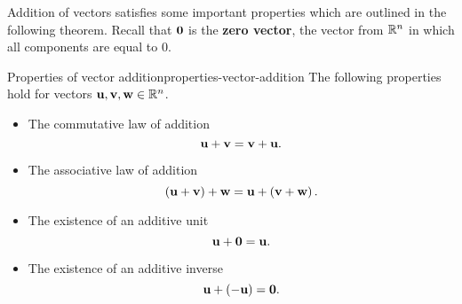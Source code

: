 Addition of vectors satisfies some important properties which are
outlined in the following theorem.  Recall that $\mbox{\bf 0}$ is the
\textbf{zero vector}, the vector
from $\mathbb{R}^{n}$ in which all components are equal to $0$.

\begin{theorem}{Properties of vector addition}{properties-vector-addition}
  The following properties hold for vectors
  $\mbox{\bf u},\mbox{\bf v},\mbox{\bf w}\in\mathbb{R}^{n}$.%
  \begin{itemize}
  \item The commutative law of addition
    \begin{equation*}
      \mbox{\bf u}+\mbox{\bf v}=\mbox{\bf v}+\mbox{\bf u}.
    \end{equation*}
  \item The associative law of addition
    \begin{equation*}
      \left(\mbox{\bf u}+\mbox{\bf v}\right) +\mbox{\bf w}=\mbox{\bf u}+\left(\mbox{\bf v}+\mbox{\bf w}\right).
    \end{equation*}
  \item The existence of an additive unit
    \begin{equation*}
      \mbox{\bf u}+\mbox{\bf 0}=\mbox{\bf u}.
    \end{equation*}
  \item The existence of an additive inverse
    \begin{equation*}
      \mbox{\bf u}+\left(-\mbox{\bf u}\right) =\mbox{\bf 0}.
    \end{equation*}
  \end{itemize}
\end{theorem}

